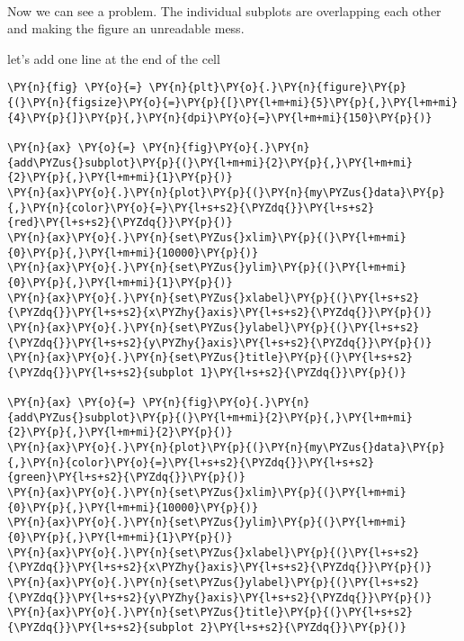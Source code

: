     \begin{center}
    \end{center}
    { \hspace*{\fill} \\}
    
    Now we can see a problem. The individual subplots are overlapping each
other and making the figure an unreadable mess.

let's add one line at the end of the cell

    \begin{tcolorbox}[breakable, size=fbox, boxrule=1pt, pad at break*=1mm,colback=cellbackground, colframe=cellborder]
\begin{Verbatim}[commandchars=\\\{\}]
\PY{n}{fig} \PY{o}{=} \PY{n}{plt}\PY{o}{.}\PY{n}{figure}\PY{p}{(}\PY{n}{figsize}\PY{o}{=}\PY{p}{[}\PY{l+m+mi}{5}\PY{p}{,}\PY{l+m+mi}{4}\PY{p}{]}\PY{p}{,}\PY{n}{dpi}\PY{o}{=}\PY{l+m+mi}{150}\PY{p}{)} 

\PY{n}{ax} \PY{o}{=} \PY{n}{fig}\PY{o}{.}\PY{n}{add\PYZus{}subplot}\PY{p}{(}\PY{l+m+mi}{2}\PY{p}{,}\PY{l+m+mi}{2}\PY{p}{,}\PY{l+m+mi}{1}\PY{p}{)}
\PY{n}{ax}\PY{o}{.}\PY{n}{plot}\PY{p}{(}\PY{n}{my\PYZus{}data}\PY{p}{,}\PY{n}{color}\PY{o}{=}\PY{l+s+s2}{\PYZdq{}}\PY{l+s+s2}{red}\PY{l+s+s2}{\PYZdq{}}\PY{p}{)}
\PY{n}{ax}\PY{o}{.}\PY{n}{set\PYZus{}xlim}\PY{p}{(}\PY{l+m+mi}{0}\PY{p}{,}\PY{l+m+mi}{10000}\PY{p}{)}
\PY{n}{ax}\PY{o}{.}\PY{n}{set\PYZus{}ylim}\PY{p}{(}\PY{l+m+mi}{0}\PY{p}{,}\PY{l+m+mi}{1}\PY{p}{)}
\PY{n}{ax}\PY{o}{.}\PY{n}{set\PYZus{}xlabel}\PY{p}{(}\PY{l+s+s2}{\PYZdq{}}\PY{l+s+s2}{x\PYZhy{}axis}\PY{l+s+s2}{\PYZdq{}}\PY{p}{)}
\PY{n}{ax}\PY{o}{.}\PY{n}{set\PYZus{}ylabel}\PY{p}{(}\PY{l+s+s2}{\PYZdq{}}\PY{l+s+s2}{y\PYZhy{}axis}\PY{l+s+s2}{\PYZdq{}}\PY{p}{)}
\PY{n}{ax}\PY{o}{.}\PY{n}{set\PYZus{}title}\PY{p}{(}\PY{l+s+s2}{\PYZdq{}}\PY{l+s+s2}{subplot 1}\PY{l+s+s2}{\PYZdq{}}\PY{p}{)}

\PY{n}{ax} \PY{o}{=} \PY{n}{fig}\PY{o}{.}\PY{n}{add\PYZus{}subplot}\PY{p}{(}\PY{l+m+mi}{2}\PY{p}{,}\PY{l+m+mi}{2}\PY{p}{,}\PY{l+m+mi}{2}\PY{p}{)}
\PY{n}{ax}\PY{o}{.}\PY{n}{plot}\PY{p}{(}\PY{n}{my\PYZus{}data}\PY{p}{,}\PY{n}{color}\PY{o}{=}\PY{l+s+s2}{\PYZdq{}}\PY{l+s+s2}{green}\PY{l+s+s2}{\PYZdq{}}\PY{p}{)}
\PY{n}{ax}\PY{o}{.}\PY{n}{set\PYZus{}xlim}\PY{p}{(}\PY{l+m+mi}{0}\PY{p}{,}\PY{l+m+mi}{10000}\PY{p}{)}
\PY{n}{ax}\PY{o}{.}\PY{n}{set\PYZus{}ylim}\PY{p}{(}\PY{l+m+mi}{0}\PY{p}{,}\PY{l+m+mi}{1}\PY{p}{)}
\PY{n}{ax}\PY{o}{.}\PY{n}{set\PYZus{}xlabel}\PY{p}{(}\PY{l+s+s2}{\PYZdq{}}\PY{l+s+s2}{x\PYZhy{}axis}\PY{l+s+s2}{\PYZdq{}}\PY{p}{)}
\PY{n}{ax}\PY{o}{.}\PY{n}{set\PYZus{}ylabel}\PY{p}{(}\PY{l+s+s2}{\PYZdq{}}\PY{l+s+s2}{y\PYZhy{}axis}\PY{l+s+s2}{\PYZdq{}}\PY{p}{)}
\PY{n}{ax}\PY{o}{.}\PY{n}{set\PYZus{}title}\PY{p}{(}\PY{l+s+s2}{\PYZdq{}}\PY{l+s+s2}{subplot 2}\PY{l+s+s2}{\PYZdq{}}\PY{p}{)}


\end{Verbatim}
\end{tcolorbox}

